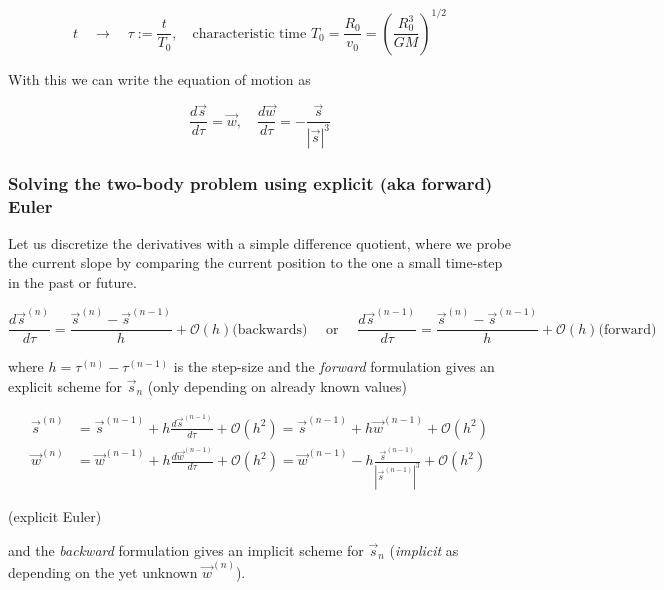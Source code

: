 \begin{equation}
  t \quad \rightarrow \quad \tau := \frac{t}{T_0}, \quad \text{characteristic time } T_0 = \frac{R_0}{v_0} = \left( \frac{R_0^3}{GM} \right)^{1/2}
\end{equation}

With this we can write the equation of motion as

\begin{equation}
  \frac{d\vec{s}}{d\tau} = \vec{w}, \quad \frac{d\vec{w}}{d\tau} = - \frac{\vec{s}}{|\vec{s}|^3}
\end{equation}

\subsubsection{Solving the two-body problem using explicit (aka forward) Euler}
Let us discretize the derivatives with a simple difference quotient, where we probe the current slope by comparing
the current position to the one a small time-step in the past or future.

\begin{equation}
  \frac{d\vec{s}^{(n)}}{d\tau} = \frac{\vec{s}^{(n)} - \vec{s}^{(n-1)}}{h} + \mathcal{O}(h) \text{(backwards)} \quad \text{ or } \quad \frac{d\vec{s}^{(n-1)}}{d\tau} = \frac{\vec{s}^{(n)} - \vec{s}^{(n-1)}}{h} + \mathcal{O}(h) \text{(forward)}
\end{equation}

\begin{mdframed}[style = padded]
where $h = \tau^{(n)} - \tau^{(n-1)}$ is the step-size and the \textit{forward} formulation gives an explicit scheme for $\vec{s}_n$ (only depending on already known values)

\begin{equation}
  \begin{aligned}
    \vec{s}^{(n)} &= \vec{s}^{(n-1)} + h \frac{d\vec{s}^{(n-1)}}{d\tau} + \mathcal{O}(h^2) = \vec{s}^{(n-1)} + h \vec{w}^{(n-1)} + \mathcal{O}(h^2)\\
    \vec{w}^{(n)} &= \vec{w}^{(n-1)} + h \frac{d\vec{w}^{(n-1)}}{d\tau} + \mathcal{O}(h^2) = \vec{w}^{(n-1)} - h \frac{\vec{s}^{(n-1)}}{|\vec{s}^{(n-1)}|^3} + \mathcal{O}(h^2)
  \end{aligned}
\end{equation}

(explicit Euler)
\end{mdframed}

and the \textit{backward} formulation gives an implicit scheme for $\vec{s}_n$ (\textit{implicit} as depending on the yet unknown $\vec{w}^{(n)}$).

